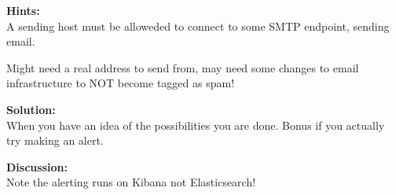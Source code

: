 \documentclass[a4paper,11pt,notitlepage]{report}
\begin{document}
{\bf Hints:}\\
A sending host must be alloweded to connect to some SMTP endpoint, sending email.

Might need a real address to send from, may need some changes to email infrastructure to NOT become tagged as spam!



{\bf Solution:}\\
When you have an idea of the possibilities you are done. Bonus if you actually try making an alert.

{\bf Discussion:}\\
Note the alerting runs on Kibana not Elasticsearch!
\end{document}
